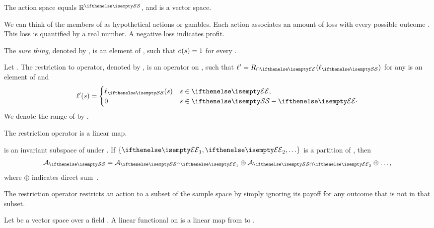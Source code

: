\begin{proposition}
    The action space equals $\field{R}^{\sampleSet}$, and is a vector space.
\end{proposition}

We can think of the members of \actionSet as hypothetical actions or gambles.
Each action associates an amount of loss with every possible outcome \inS.
This loss is quantified by a real number.
A negative loss indicates profit.

\begin{definition} 
    The \emph{sure thing}, denoted by \sure[], is an element of \actionSet, such that $\sure[](s) = 1$ for every \inS.
\end{definition}

\begin{definition}
    Let \eventInS.
    The restriction to \event operator, denoted by \rstOp, is an operator on \actionSet,
    such that $\actAlt[ ] = \rstOp(\act)$ for any \inA{\act} is an element of \actionSet and
    \[
        \actAlt[ ](s) =
        \begin{cases}
            \act(s)       & s \in \event, \\
            0       & s \in \sampleSet - \event \cdot
        \end{cases}
    \]
    We denote the range of \rstOp by \rstActionSet.
\end{definition}

\begin{proposition}
    The restriction operator is a linear map.
\end{proposition}

\begin{proposition}
    \rstActionSet is an invariant subspace of \actionSet under \rstOp.
    If $\{\event[1], \event[2], \ldots \}$ is a partition of \sampleSet, then
    \[
        \actionSet = \rstActionSet[1] \oplus \rstActionSet[2] \oplus \ldots,
    \]
    where $\oplus$ indicates direct sum~\cite{axler}.
\end{proposition}

The restriction operator restricts an action to a subset of the sample space by simply ignoring its payoff
for any outcome that is not in that subset.

\begin{definition} 
    Let  be a vector space over a field .
    A linear functional on  is a linear map from  to .
\end{definition}

